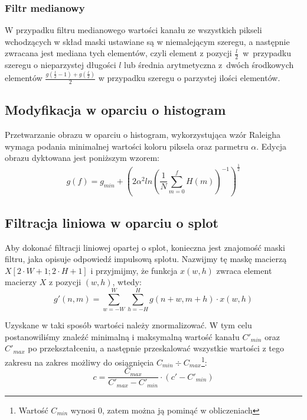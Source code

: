 \documentclass{classrep}
\begin{document}
\subsubsection{Filtr medianowy}
\label{filter.median}
W przypadku filtru medianowego wartości kanału ze wszystkich pikseli wchodzących w skład maski ustawiane są w niemalejącym szeregu, a następnie zwracana jest mediana tych elementów, czyli element z pozycji $\frac{l}{2}$~w~przypadku szeregu o nieparzystej długości $l$ lub średnia arytmetyczna z~dwóch środkowych elementów $\frac{g(\frac{l}{2} - 1) + g(\frac{l}{2})}{2}$ w przypadku szeregu o parzystej ilości elementów.

\subsection{Modyfikacja w oparciu o histogram}
Przetwarzanie obrazu w oparciu o histogram, wykorzystująca wzór Raleigha wymaga podania minimalnej wartości koloru piksela oraz parmetru $\alpha$. 
Edycja obrazu dyktowana jest poniższym wzorem:
\begin{equation}
g(f) = g_{min} + (2\alpha^{2}ln(\frac{1}{N} \displaystyle \sum \limits_{m=0}^{f} H(m))^{-1})^{\frac{1}{2}}
\end{equation}

\subsection{Filtracja liniowa w oparciu o splot}
\label{filter.convolution}
Aby dokonać filtracji liniowej opartej o splot, konieczna jest znajomość maski filtru, jaka opisuje odpowiedź impulsową splotu. Nazwijmy tę maskę macierzą $X[2 \cdot W + 1; 2 \cdot H + 1]$ i przyjmijmy, że funkcja $x(w, h)$ zwraca element macierzy $X$ z pozycji $(w, h)$, wtedy:
\begin{equation}
 g'(n, m) = \displaystyle \sum \limits_{w=-W}^W \displaystyle \sum \limits_{h=-H}^H g(n + w, m + h) \cdot x(w, h)
\end{equation}

Uzyskane w taki sposób wartości należy znormalizować. W tym celu postanowiliśmy znaleźć minimalną i maksymalną wartość kanału $C'_{min}$ oraz $C'_{max}$ po przekształceniu, a następnie przeskalować wszystkie wartości z tego zakresu na zakres możliwy do osiągnięcia $C_{min} \div C_{max}$\footnote{Wartość $C_{min}$ wynosi 0, zatem można ją pominąć w obliczeniach}:
\begin{equation}
 \label{eq:normalization}
 c = \frac{C_{max}}{C'_{max} - C'_{min}} \cdot (c' - C'_{min})
\end{equation}
\end{document}
